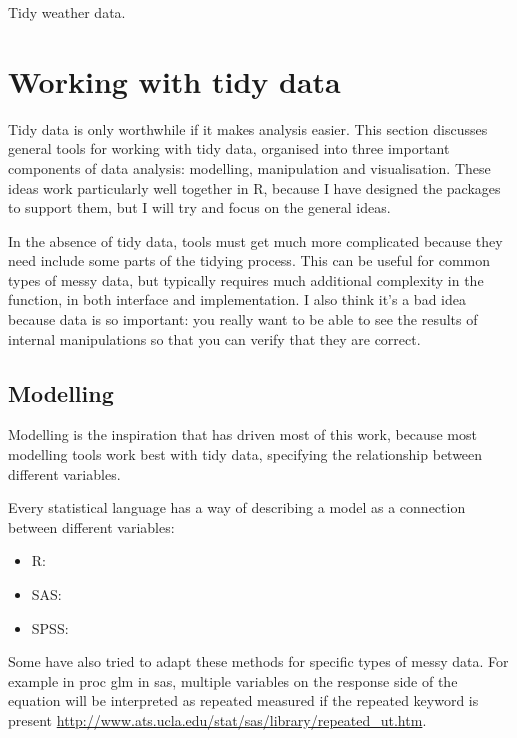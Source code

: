 \documentclass[oneside]{article}
\begin{document}
\begin{table}[htbp]
  \centering
  
  \caption{Tidy weather data.}
  \label{tbl:weather-clean-2}
\end{table}

\section{Working with tidy data}

Tidy data is only worthwhile if it makes analysis easier. This section discusses general tools for working with tidy data, organised into three important components of data analysis: modelling, manipulation and visualisation. These ideas work particularly well together in R, because I have designed the packages to support them, but I will try and focus on the general ideas. 

In the absence of tidy data, tools must get much more complicated because they need include some parts of the tidying process. This can be useful for common types of messy data, but typically requires much additional complexity in the function, in both interface and implementation. I also think it's a bad idea because data is so important: you really want to be able to see the results of internal manipulations so that you can verify that they are correct.

\subsection{Modelling}

Modelling is the inspiration that has driven most of this work, because most modelling tools work best with tidy data, specifying the relationship between different variables. 

Every statistical language has a way of describing a model as a connection between different variables:

\begin{itemize}

\item R:
\item SAS:
\item SPSS:
\end{itemize}

Some have also tried to adapt these methods for specific types of messy data. For example in {\sc proc glm} in {\sc sas}, multiple variables on the response side of the equation will be interpreted as repeated measured if the {\sc repeated} keyword is present \url{http://www.ats.ucla.edu/stat/sas/library/repeated_ut.htm}.
\end{document}
